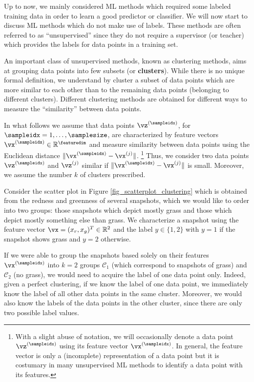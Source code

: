 \documentclass[12pt]{report}
\begin{document}
Up to now, we mainly considered ML methods which required some labeled training data in order to 
learn a good predictor or classifier. We will now start to discuss ML methods which do not make use 
of labels. These methods are often referred to as ``unsupervised'' since they do not require a supervisor 
(or teacher) which provides the labels for data points in a training set. 

An important class of unsupervised methods, known as clustering methods, aims at grouping data points 
into few subsets (or {\bf clusters}). While there is no unique formal definition, we understand by cluster a 
subset of data points which are more similar to each other than to the remaining data points (belonging 
to different clusters). Different clustering methods are obtained for different ways to measure the 
``similarity'' between data points. 

In what follows we assume that data points $\vz^{(\sampleidx)}$, for $\sampleidx=1,\ldots,\samplesize$, 
are characterized by feature vectors $\vx^{(\sampleidx)} \in \mathbb{R}^{\featuredim}$ and measure 
similarity between data points using the Euclidean distance $\| \vx^{(\sampleidx)} - \vx^{(j)} \|$.
\footnote{With a slight abuse of notation, we will occasionally denote a data point $\vz^{(\sampleidx)}$ 
using its feature vector $\vx^{(\sampleidx)}$. In general, the feature vector is only a (incomplete) representation 
of a data point but it is costumary in many unsupervised ML methods to identify a data point with its features.} 
Thus, we consider two data points $\vz^{(\sampleidx)}$ and $\vz^{(j)}$ similar if $\| \vx^{(\sampleidx)} - \vx^{(j)} \|$ 
is small. Moreover, we assume the number $k$ of clusters prescribed. 


Consider the scatter plot in Figure \ref{fig_scatterplot_clustering} which is obtained from the redness 
and greenness of several snapshots, which we would like to order into two groups: those snapshots 
which depict mostly grass and those which depict mostly something else than grass. We characterize 
a snapshot using the feature vector $\vx = (x_{r},x_{g})^{T} \in \mathbb{R}^{2}$ and the label $y \in \{ 1,2 \}$ 
with $y=1$ if the snapshot shows grass and $y=2$ otherwise. 

If we were able to group the snapshots based solely on their features $\vx^{(\sampleidx)}$ into $k=2$ 
groups $\mathcal{C}_{1}$ (which correspond to snapshots of grass) and $\mathcal{C}_{2}$ (no grass), 
we would need to acquire the label of one data point only. Indeed, given a perfect clustering, if we know 
the label of one data point, we immediately know the label of all other data points in the same cluster. 
Moreover, we would also know the labels of the data points in the other cluster, since there 
are only two possible label values.  
\end{document}
